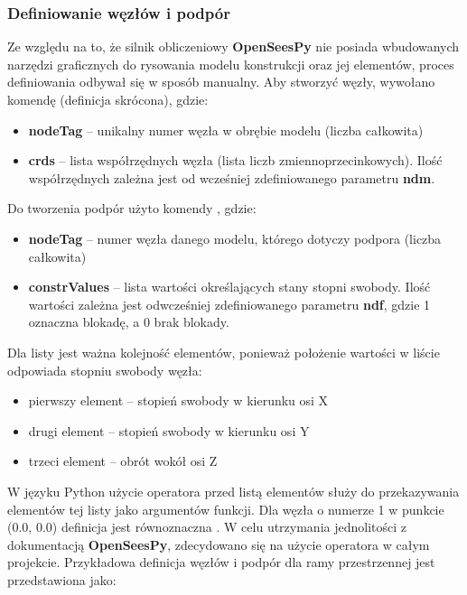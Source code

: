 \subsubsection{Definiowanie węzłów i podpór}

Ze względu na to, że silnik obliczeniowy \textbf{OpenSeesPy} nie posiada wbudowanych narzędzi graficznych do rysowania
modelu konstrukcji oraz jej elementów, proces definiowania odbywał się w sposób manualny.
Aby stworzyć węzły, wywołano komendę  (definicja skrócona), gdzie:

\begin{itemize}
    \item \textbf{nodeTag} – unikalny numer węzła w obrębie modelu (liczba całkowita)
    \item \textbf{crds} – lista współrzędnych węzła (lista liczb zmiennoprzecinkowych). Ilość współrzędnych zależna jest od wcześniej zdefiniowanego parametru \textbf{ndm}.
\end{itemize}

Do tworzenia podpór użyto komendy , gdzie:

\begin{itemize}
    \item \textbf{nodeTag} – numer węzła danego modelu, którego dotyczy podpora (liczba całkowita)
    \item \textbf{constrValues} – lista wartości określających stany stopni swobody. Ilość wartości zależna jest odwcześniej zdefiniowanego parametru \textbf{ndf}, gdzie 1 oznaczna blokadę, a 0 brak blokady.
\end{itemize}

Dla listy  jest ważna kolejność elementów, ponieważ położenie wartości w liście odpowiada stopniu swobody węzła:
\begin{itemize}
    \item pierwszy element – stopień swobody w kierunku osi X
    \item drugi element – stopień swobody w kierunku osi Y
    \item trzeci element – obrót wokół osi Z
\end{itemize}

W języku Python użycie operatora \inlinecode{*} przed listą elementów służy do przekazywania elementów tej listy jako argumentów funkcji.
Dla węzła o numerze 1 w punkcie (0.0, 0.0) definicja  jest równoznaczna .
W celu utrzymania jednolitości z dokumentacją \textbf{OpenSeesPy}, zdecydowano się na użycie operatora \inlinecode{*} w całym projekcie.
Przykładowa definicja węzłów i podpór dla ramy przestrzennej jest przedstawiona jako:


